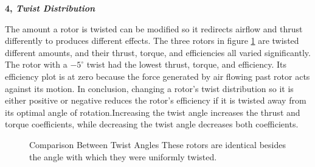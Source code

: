 \documentclass{article}
\begin{document}
\textbf{4, \emph{Twist Distribution}} \newline

The amount a rotor is twisted can be modified so it redirects airflow and thrust differently to produces different effects. The three rotors in figure \ref{fig:5} are twisted different amounts, and their thrust, torque, and efficiencies all varied significantly. The rotor with a $-5^{\circ}$ twist had the lowest thrust, torque, and efficiency. Its efficiency plot is at zero because the force generated by air flowing past rotor acts against its motion. In conclusion, changing a rotor's twist distribution so it is either positive or negative reduces the rotor's efficiency if it is twisted away from its optimal angle of rotation.Increasing the twist angle increases the thrust and torque coefficients, while decreasing the twist angle decreases both coefficients. \newline

\begin{figure}
  \centering
  \caption{Comparison Between Twist Angles \newline These rotors are identical besides the angle with which they were uniformly twisted.}
  \label{fig:5}
\end{figure}
\end{document}
